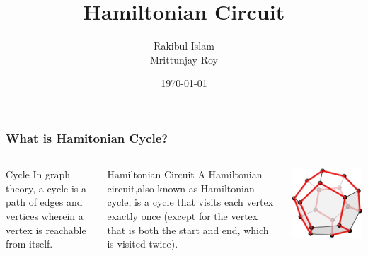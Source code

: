 \documentclass{beamer}
\title{Hamiltonian Circuit}
\author[Rafi and Mrittunjay]{Rakibul Islam \inst{1}\\
Mrittunjay Roy \inst{1}}
\institute[CSE,BUET]{
\inst{1}
Department of CSE,BUET\\
}
\date{\today}
\begin{document}
\begin{frame}
\titlepage
\end{frame}
\begin{frame}
\frametitle{What is Hamitonian Cycle?}
\begin{columns}
\begin{block}{Cycle}
In graph theory, a cycle is a path of edges and vertices wherein a vertex is reachable from itself.
\end{block}
\begin{block}{Hamiltonian Circuit}
A Hamiltonian circuit,also known as Hamiltonian cycle,  is a cycle that visits each vertex exactly once (except for the vertex that is both the start and end, which is visited twice).
\end{block}
\includegraphics[scale=.2]{hamcycle.png}
\end{columns}
\end{frame}
\end{document}
